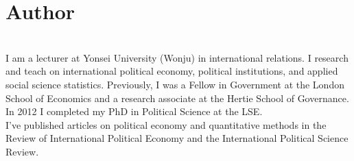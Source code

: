 {\chapter*{Author}}

 \\[1cm]

\noindent I am a lecturer at Yonsei University (Wonju) in international relations. I research and teach on international political economy, political institutions, and applied social science statistics.  Previously, I was a Fellow in Government at the London School of Economics and a research associate at the Hertie School of Governance. In 2012 I completed my PhD in Political Science at the LSE.  \\[0.25cm]

\noindent I've published articles on political economy and quantitative methods in the Review of International Political Economy and the International Political Science Review.

